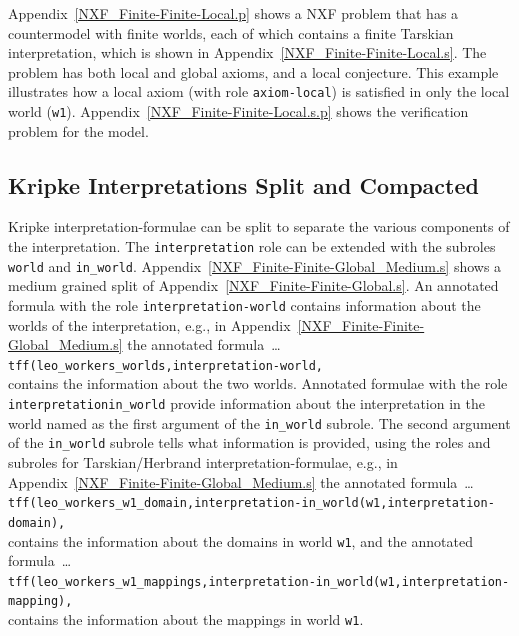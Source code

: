 \documentclass{easychair}
\newcommand{\smalltt}[1]{\small \texttt{#1}}
\begin{document}
Appendix~\ref{NXF_Finite-Finite-Local.p} shows a NXF problem that has a countermodel with
finite worlds, each of which contains a finite Tarskian interpretation, which is shown in
Appendix~\ref{NXF_Finite-Finite-Local.s}.
The problem has both local and global axioms, and a local conjecture.
This example illustrates how a local axiom (with role {\tt axiom-local}) is satisfied in only the 
local world ({\tt w1}).
Appendix~\ref{NXF_Finite-Finite-Local.s.p} shows the verification problem for the model.

\subsection{Kripke Interpretations Split and Compacted}
\label{NewKripkeSplitCompact}

Kripke interpretation-formulae can be split to separate the various components of the 
interpretation.
The {\tt interpretation} role can be extended with the subroles {\tt world} and {\tt in\_world}.
Appendix~\ref{NXF_Finite-Finite-Global_Medium.s} shows a medium grained split of 
Appendix~\ref{NXF_Finite-Finite-Global.s}.
An annotated formula with the role {\tt interpretation-world} contains information about the
worlds of the interpretation, e.g., in Appendix~\ref{NXF_Finite-Finite-Global_Medium.s} the
annotated formula~\ldots \\
\hspace*{0.5cm}\smalltt{tff(leo\_workers\_worlds,interpretation-world,} \\
contains the information about the two worlds.
Annotated formulae with the role {\tt interpretation\-in\_world} provide information about the
interpretation in the world named as the first argument of the {\tt in\_world} subrole.
The second argument of the {\tt in\_world} subrole tells what information is provided, using the
roles and subroles for Tarskian/Herbrand interpretation-formulae, e.g., in 
Appendix~\ref{NXF_Finite-Finite-Global_Medium.s} the annotated formula~\ldots \\
\hspace*{0.5cm}\smalltt{tff(leo\_workers\_w1\_domain,interpretation-in\_world(w1,interpretation-domain),} \\
contains the information about the domains in world {\tt w1}, and the annotated formula~\ldots \\
\hspace*{0.5cm}\smalltt{tff(leo\_workers\_w1\_mappings,interpretation-in\_world(w1,interpretation-mapping),} \\
contains the information about the mappings in world {\tt w1}.
\end{document}
